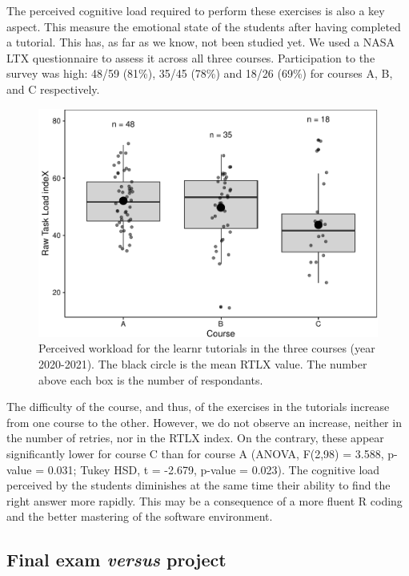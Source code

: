 \documentclass[
]{article}
\begin{document}
The perceived cognitive load required to perform these exercises is also
a key aspect. This measure the emotional state of the students after
having completed a tutorial. This has, as far as we know, not been
studied yet. We used a NASA LTX questionnaire to assess it across all
three courses. Participation to the survey was high: 48/59 (81\%), 35/45
(78\%) and 18/26 (69\%) for courses A, B, and C respectively.

\begin{figure}
\centering
\includegraphics{teaching_data_science_files/figure-latex/fig_rtlx-1.pdf}
\caption{Perceived workload for the learnr tutorials in the three
courses (year 2020-2021). The black circle is the mean RTLX value. The
number above each box is the number of respondants.}
\end{figure}

The difficulty of the course, and thus, of the exercises in the
tutorials increase from one course to the other. However, we do not
observe an increase, neither in the number of retries, nor in the RTLX
index. On the contrary, these appear significantly lower for course C
than for course A (ANOVA, F(2,98) = 3.588, p-value = 0.031; Tukey HSD, t
= -2.679, p-value = 0.023). The cognitive load perceived by the students
diminishes at the same time their ability to find the right answer more
rapidly. This may be a consequence of a more fluent R coding and the
better mastering of the software environment.

\hypertarget{final-exam-versus-project}{%
\subsection{\texorpdfstring{Final exam \emph{versus}
project}{Final exam versus project}}\label{final-exam-versus-project}}
\end{document}
